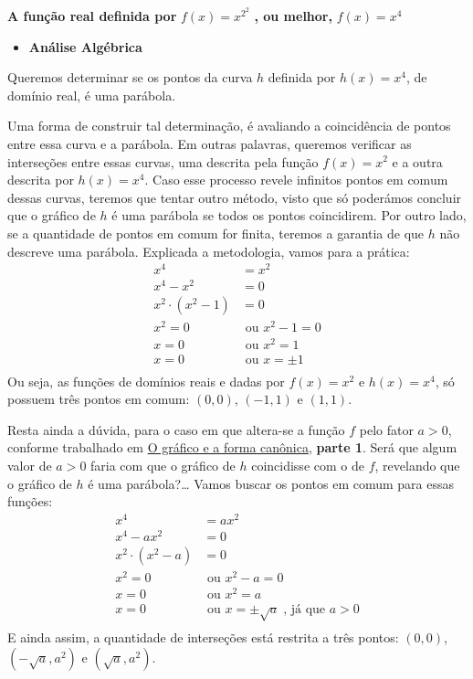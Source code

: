 {\textbf{A função real definida por} \(f(x)=x^{2^2}\) \textbf{, ou melhor,} \(f(x)=x^4\)
\begin{itemize}
\item {} 
\textbf{Análise Algébrica}

\end{itemize}

Queremos determinar se os pontos da curva \(h\) definida por \(h(x)=x^4\), de domínio real, é uma parábola.

Uma forma de construir tal determinação, é avaliando a coincidência de pontos entre essa curva e a parábola. Em outras palavras, queremos verificar as interseções entre essas curvas, uma descrita pela função \(f(x) = x^2\) e a outra descrita por \(h(x)=x^4\). Caso esse processo revele infinitos pontos em comum dessas curvas, teremos que tentar outro método, visto que só poderámos concluir que o gráfico de \(h\) é uma parábola se todos os pontos coincidirem. Por outro lado, se a quantidade de pontos em comum for finita, teremos a garantia de que \(h\) não descreve uma parábola. Explicada a metodologia, vamos para a prática:
\begin{equation*}
\begin{split}x^4 & = x^2 \\
x^4-x^2 & = 0 \\
x^2 \cdot (x^2-1) & = 0 \\
x^2 = 0 & \text{ ou } x^2-1=0 \\
x = 0 & \text{ ou } x^2=1 \\
x = 0 & \text{ ou } x = \pm 1 \\\end{split}
\end{equation*}
Ou seja, as funções de domínios reais e dadas por \(f(x)=x^2\) e \(h(x)=x^4\), só possuem três pontos em comum: \((0,0)\), \((-1,1)\) e \((1,1)\).

Resta ainda a dúvida, para o caso em que altera-se a função \(f\) pelo fator \(a>0\), conforme trabalhado em \hyperref[\detokenize{AF209-5:ativ-funcao-quadratica-graf-curva}]{O gráfico e a forma canônica}, \textbf{parte 1}. Será que algum valor de \(a>0\) faria com que o gráfico de \(h\) coincidisse com o de \(f\), revelando que o gráfico de \(h\) é uma parábola?… Vamos buscar os pontos em comum para essas funções:
\begin{equation*}
\begin{split}x^4 & = ax^2 \\
x^4-ax^2 & = 0 \\
x^2 \cdot (x^2-a) & = 0 \\
x^2 = 0 & \text{ ou }  x^2-a=0 \\
x = 0 & \text{ ou }  x^2=a \\
x = 0 & \text{ ou }  x = \pm \sqrt{a}\; \text{, já que }  a>0 \\\end{split}
\end{equation*}
E ainda assim, a quantidade de interseções está restrita a três pontos: \((0,0)\), \((-\sqrt{a},a^2)\) e \((\sqrt{a},a^2)\).

}
